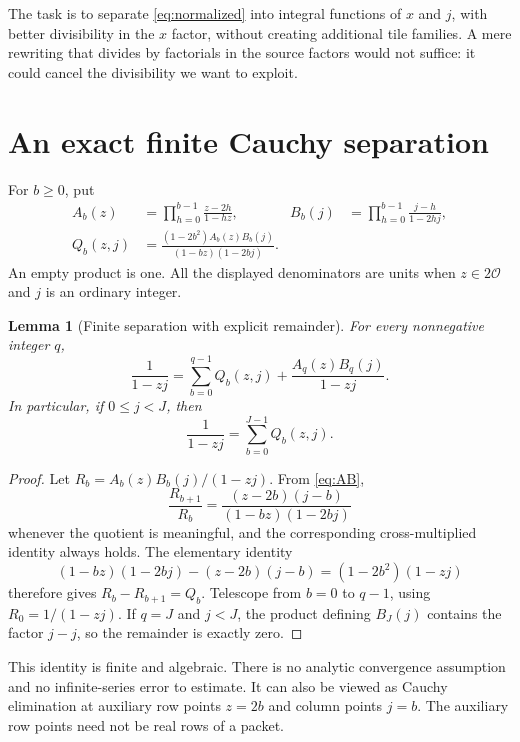 \documentclass[11pt]{article}
\newtheorem{lemma}[theorem]{Lemma}
\theoremstyle{remark}
\newcommand{\OO}{\mathcal O}
\begin{document}
The task is to separate \eqref{eq:normalized} into integral functions of $x$ and $j$, with better divisibility in the $x$ factor, without creating additional tile families. A mere rewriting that divides by factorials in the source factors would not suffice: it could cancel the divisibility we want to exploit.

\section{An exact finite Cauchy separation}\label{sec:identity}

For $b\ge0$, put
\begin{align}
 A_b(z)&=\prod_{h=0}^{b-1}\frac{z-2h}{1-hz},&
 B_b(j)&=\prod_{h=0}^{b-1}\frac{j-h}{1-2hj},\label{eq:AB}\\
 Q_b(z,j)&=\frac{(1-2b^2)A_b(z)B_b(j)}{(1-bz)(1-2bj)}.
 \label{eq:Q}
\end{align}
An empty product is one. All the displayed denominators are units when $z\in2\OO$ and $j$ is an ordinary integer.

\begin{lemma}[Finite separation with explicit remainder]\label{lem:identity}
For every nonnegative integer $q$,
\begin{equation}\label{eq:finite-separation}
 \frac1{1-zj}
 =\sum_{b=0}^{q-1}Q_b(z,j)
    +\frac{A_q(z)B_q(j)}{1-zj}.
\end{equation}
In particular, if $0\le j<J$, then
\begin{equation}\label{eq:exact-J}
 \frac1{1-zj}=\sum_{b=0}^{J-1}Q_b(z,j).
\end{equation}
\end{lemma}

\begin{proof}
Let $R_b=A_b(z)B_b(j)/(1-zj)$. From \eqref{eq:AB},
\[
 \frac{R_{b+1}}{R_b}
 =\frac{(z-2b)(j-b)}{(1-bz)(1-2bj)}
\]
whenever the quotient is meaningful, and the corresponding cross-multiplied identity always holds. The elementary identity
\[
 (1-bz)(1-2bj)-(z-2b)(j-b)
 =(1-2b^2)(1-zj)
\]
therefore gives $R_b-R_{b+1}=Q_b$. Telescope from $b=0$ to $q-1$, using $R_0=1/(1-zj)$. If $q=J$ and $j<J$, the product defining $B_J(j)$ contains the factor $j-j$, so the remainder is exactly zero.
\end{proof}

This identity is finite and algebraic. There is no analytic convergence assumption and no infinite-series error to estimate. It can also be viewed as Cauchy elimination at auxiliary row points $z=2b$ and column points $j=b$. The auxiliary row points need not be real rows of a packet.
\end{document}
